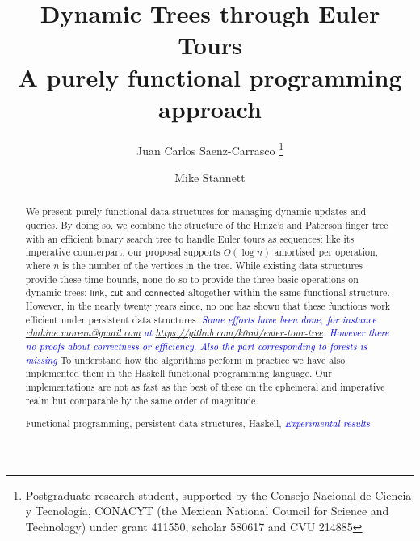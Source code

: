 \documentclass[runningheads,a4paper]{llncs}
\newcommand{\MATHSF}[1]{\ensuremath{\mathsf{#1}}\xspace}
\newcommand{\link}{\MATHSF{link}}
\newcommand{\cut}{\MATHSF{cut}}
\newcommand{\connected}{\MATHSF{connected}}
\newcommand{\keywords}[1]{\par\addvspace\baselineskip
\noindent\keywordname\enspace\ignorespaces#1}
\newcommand{\tcb} [1]{\emph{\textcolor{blue}{#1}}}
\begin{document}
\mainmatter  %

\title{Dynamic Trees through Euler Tours\\ \large{A purely functional programming approach}}


\author{Juan Carlos Saenz-Carrasco%
\thanks{Postgraduate research student, supported by the Consejo Nacional de Ciencia y Tecnolog\'{i}a, CONACYT (the Mexican National Council for Science and Technology) under grant 411550, scholar 580617 and CVU 214885}%
\and Mike Stannett}




\maketitle


\begin{abstract}
We present purely-functional data structures for managing dynamic updates and queries. By doing so, we combine the structure of the Hinze's and Paterson finger tree with an efficient binary search tree to handle Euler tours as sequences: like its imperative counterpart, our proposal supports $O(\log n)$ amortised per operation, where $n$ is the number of the vertices in the tree. While existing data structures provide these time bounds, none do so to provide the three basic operations on dynamic trees: \link, \cut and \connected altogether within the same functional structure. However, in the nearly twenty years since, no one has shown that these functions work efficient under persistent data structures. \tcb{Some efforts have been done, for instance \url{chahine.moreau@gmail.com} at \url{https://github.com/k0ral/euler-tour-tree}. However there no proofs about correctness or efficiency. Also the part corresponding to forests is missing}
To understand how the algorithms perform in practice we have also implemented them in the Haskell functional programming language. Our implementations are not as fast as the best of these on the ephemeral and imperative realm but comparable by the same order of magnitude.
\keywords{Functional programming, persistent data structures, Haskell, \tcb{Experimental results}}
\end{abstract}
\end{document}
